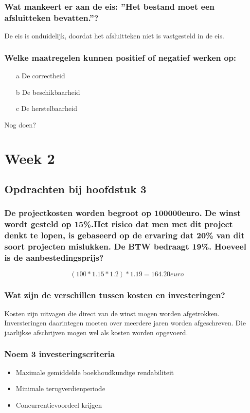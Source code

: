\documentclass[a4paper,titlepage]{artikel1}
\begin{document}
   
   \subsubsection[Opdracht 9]{Wat mankeert er aan de eis: ''Het bestand moet een afsluitteken bevatten.''?}
   De eis is onduidelijk, doordat het afsluitteken niet is vastgesteld in de eis. 
   
   \subsubsection[Opdracht 10]{Welke maatregelen kunnen positief of negatief werken op:}
   \begin{itemize}
    \item[a] De correctheid
    \item[b] De beschikbaarheid
    \item[c] De herstelbaarheid
   \end{itemize}
   Nog doen?
   
 \section{Week 2}
  \subsection{Opdrachten bij hoofdstuk 3}
   \subsubsection[Opdracht 1]{De projectkosten worden begroot op
   100000euro. De winst wordt gesteld op 15\%.Het risico dat men met dit
   project denkt te lopen, is gebaseerd op de ervaring dat 20\% van dit
   soort projecten mislukken. De BTW bedraagt 19\%. Hoeveel is de
   aanbestedingsprijs?}
   \begin{displaymath}
    (100*1.15*1.2)*1.19={164.20}euro
   \end{displaymath}
   
   \subsubsection[Opdracht 2]{Wat zijn de verschillen tussen kosten en investeringen?}
   Kosten zijn uitvagen die direct van de winst mogen worden afgetrokken. Inversteringen daarintegen moeten over meerdere jaren worden afgeschreven. Die jaarlijkse afschrijven mogen wel als kosten worden opgevoerd.
   
   \subsubsection[Opdracht 3]{Noem 3 investeringscriteria}
   \begin{itemize}
    \item Maximale gemiddelde boekhoudkundige rendabiliteit
    \item Minimale terugverdienperiode
    \item Concurrentievoordeel krijgen
   \end{itemize}
\end{document}
